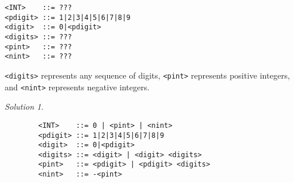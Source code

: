 \documentclass{article}
\theoremstyle{remark} \newtheorem*{solution}{Solution}
\begin{document}
\begin{lstlisting}
<INT>    ::= ???
<pdigit> ::= 1|2|3|4|5|6|7|8|9
<digit>  ::= 0|<pdigit>
<digits> ::= ???
<pint>   ::= ???
<nint>   ::= ???
\end{lstlisting}
\texttt{<digits>} represents any sequence of digits, \texttt{<pint>}
represents positive integers, and \texttt{<nint>} represents negative
integers.

\begin{solution}
\indent
    \begin{lstlisting}
        <INT>    ::= 0 | <pint> | <nint>
        <pdigit> ::= 1|2|3|4|5|6|7|8|9
        <digit>  ::= 0|<pdigit>
        <digits> ::= <digit> | <digit> <digits>
        <pint>   ::= <pdigit> | <pdigit> <digits>
        <nint>   ::= -<pint>
    \end{lstlisting}
\end{solution}
\end{document}
